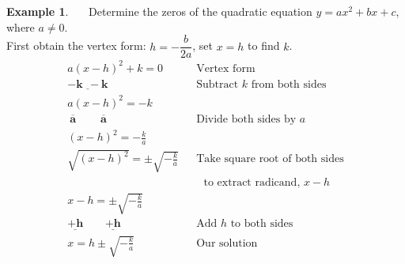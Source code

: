 \documentclass[12pt]{book}
\theoremstyle{definition}
\newtheorem{example}{Example}
\newcommand{\tmmathbf}[1]{\ensuremath{\boldsymbol{#1}}}
\begin{document}
\begin{example}~~~Determine the zeros of the quadratic equation $y=ax^2+bx+c$, where $a\neq 0$.\\
First obtain the vertex form:  $h=-\dfrac{b}{2a}$, set $x=h$ to find $k$.
\begin{eqnarray*}
a(x-h)^2+k=0~~~ & &\text{Vertex~form}\\
\tmmathbf{\underline{-k~~-k}} & & \text{Subtract~} k \text{~from~both~sides}\\
a(x-h)^2=-k & &\\
\tmmathbf{\overline{~a~}~~~~~~~~\overline{~a~}} & &  \text{Divide~both~sides~by~} a\\
(x-h)^2=-\frac{k}{a}& &\\
\sqrt{(x-h)^2}=\pm\sqrt{-\frac{k}{a}}& &\text{Take~square~root~of~both~sides}\\
& & ~~~\text{to~extract~radicand,~} x-h\\
x-h=\pm\sqrt{-\frac{k}{a}} & & \\
\tmmathbf{\underline{+h}~~~~~~~~~\underline{+h}} & & \text{Add~} h \text{~to~both~sides}\\
x=h\pm\sqrt{-\frac{k}{a}} & & \text{Our~solution}
\end{eqnarray*}
\end{example}
\end{document}
